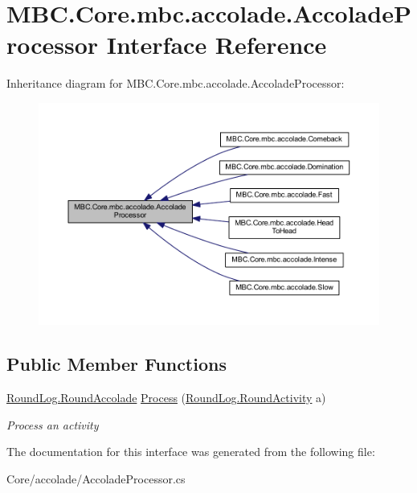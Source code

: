 \hypertarget{interface_m_b_c_1_1_core_1_1mbc_1_1accolade_1_1_accolade_processor}{\section{M\-B\-C.\-Core.\-mbc.\-accolade.\-Accolade\-Processor Interface Reference}
\label{interface_m_b_c_1_1_core_1_1mbc_1_1accolade_1_1_accolade_processor}
}


Inheritance diagram for M\-B\-C.\-Core.\-mbc.\-accolade.\-Accolade\-Processor\-:
\nopagebreak
\begin{figure}[H]
\begin{center}
\leavevmode
\includegraphics[width=350pt]{interface_m_b_c_1_1_core_1_1mbc_1_1accolade_1_1_accolade_processor__inherit__graph}
\end{center}
\end{figure}
\subsection*{Public Member Functions}
\begin{DoxyCompactItemize}
\item 
\hypertarget{interface_m_b_c_1_1_core_1_1mbc_1_1accolade_1_1_accolade_processor_a05f404f33d6ea3c54b6910094b992bac}{\hyperlink{class_m_b_c_1_1_core_1_1_round_log_a4060830ca7135aa755ec5b6d24aa30e6}{Round\-Log.\-Round\-Accolade} \hyperlink{interface_m_b_c_1_1_core_1_1mbc_1_1accolade_1_1_accolade_processor_a05f404f33d6ea3c54b6910094b992bac}{Process} (\hyperlink{class_m_b_c_1_1_core_1_1_round_log_1_1_round_activity}{Round\-Log.\-Round\-Activity} a)}\label{interface_m_b_c_1_1_core_1_1mbc_1_1accolade_1_1_accolade_processor_a05f404f33d6ea3c54b6910094b992bac}

\begin{DoxyCompactList}\small\item\em Process an activity\end{DoxyCompactList}\end{DoxyCompactItemize}


The documentation for this interface was generated from the following file\-:\begin{DoxyCompactItemize}
\item 
Core/accolade/Accolade\-Processor.\-cs\end{DoxyCompactItemize}
